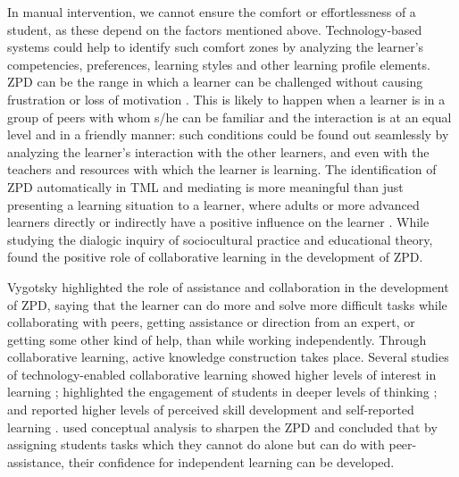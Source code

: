 \begin{multicols}{2}
In manual intervention, we cannot ensure the comfort or effortlessness of a student, as these depend on the factors mentioned above. Technology-based systems could help to identify such comfort zones by analyzing the learner’s competencies, preferences, learning styles and other learning profile elements. ZPD can be the range in which a learner can be challenged without causing frustration or loss of motivation \cite{art2-key11}. This is likely to happen when a learner is in a group of peers with whom s/he can be familiar and the interaction is at an equal level and in a friendly manner: such conditions could be found out seamlessly by analyzing the learner’s interaction with the other learners, and even with the teachers and resources with which the learner is learning. The identification of ZPD automatically in TML and mediating is more meaningful than just presenting a learning situation to a learner, where adults or more advanced learners directly or indirectly have a positive influence on the learner \cite{art2-key17}. While studying the dialogic inquiry of sociocultural practice and educational theory, \cite{art2-key54} found the positive role of collaborative learning in the development of ZPD.

Vygotsky \cite{art2-key51} highlighted the role of assistance and collaboration in the development of ZPD, saying that the learner can do more and solve more difficult tasks while collaborating with peers, getting assistance or direction from an expert, or getting some other kind of help, than while working independently. Through collaborative learning, active knowledge construction takes place. Several studies of technology-enabled collaborative learning showed higher levels of interest in learning \cite{art2-key31}; highlighted the engagement of students in deeper levels of thinking \cite{art2-key30, art2-key32}; and reported higher levels of perceived skill development and self-reported learning \cite{art2-key02}. \cite{art2-key52} used conceptual analysis to sharpen the ZPD and concluded that by assigning students tasks which they cannot do alone but can do with peer-assistance, their confidence for independent learning can be developed.


\end{multicols}
